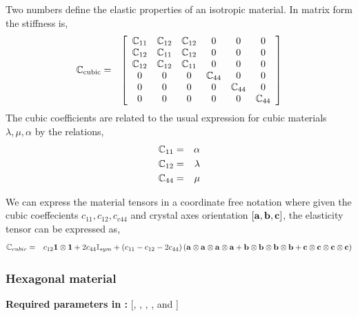 Two numbers define the elastic properties of an isotropic material.
In matrix form the stiffness is,
\begin{eqnarray}
\mathbb{C}_\text{cubic} &=&
\left[
\begin{array}{cccccc}
\mathbb{C}_{11}  & \mathbb{C}_{12}  &  \mathbb{C}_{12}  &   0   &   0    &  0    \\
\mathbb{C}_{12}  & \mathbb{C}_{11}  &  \mathbb{C}_{12}  &   0   &   0    &  0    \\
\mathbb{C}_{12}  & \mathbb{C}_{12}  &  \mathbb{C}_{11}  &   0   &   0    &  0    \\
    0   &     0   &      0   & \mathbb{C}_{44} & 0 & 0 \\
    0   &     0   &      0   &   0   & \mathbb{C}_{44} &  0    \\
    0   &     0   &      0   &   0   &   0    & \mathbb{C}_{44}
\end{array}
\right]
\end{eqnarray}
The cubic coefficients are related to the usual expression for cubic
materials $\lambda, \mu, \alpha$ by the relations,
\begin{eqnarray}
\mathbb{C}_{11} &=& \alpha  \nonumber \\
\mathbb{C}_{12} &=& \lambda \nonumber \\
\mathbb{C}_{44} &=& \mu     \nonumber
\end{eqnarray}

We can express the material tensors in a coordinate free notation
where given
the cubic coeffecients $c_{11},c_{12},c_{c44}$ and crystal
axes orientation $[\mathbf{a},\mathbf{b},\mathbf{c}]$, the elasticity tensor can be
expressed as,
\begin{eqnarray}
\mathbb{C}_{cubic} &=&  c_{12}\mathbf{1}\otimes\mathbf{1}
                +2c_{44}\mathbb{I}_{sym}
                + \left( c_{11}-c_{12}-2c_{44} \right)
                  \left(   \mathbf{a} \otimes \mathbf{a} \otimes \mathbf{a} \otimes \mathbf{a}
                         + \mathbf{b} \otimes \mathbf{b} \otimes \mathbf{b} \otimes \mathbf{b}
                         + \mathbf{c} \otimes \mathbf{c} \otimes \mathbf{c} \otimes \mathbf{c} \right)
                                                  \nonumber
\end{eqnarray}

\subsubsection{Hexagonal material}
\begin{flushleft}
  \textbf{Required parameters in :}
  [, , , , and ]
\end{flushleft}

